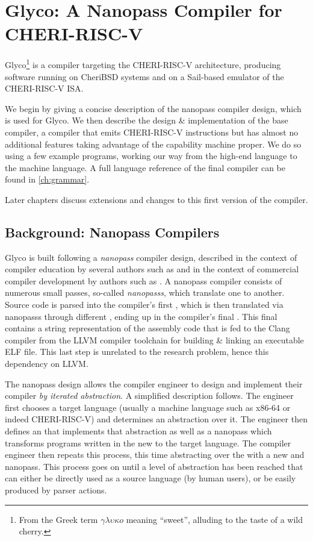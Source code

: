 \documentclass[main.tex]{subfiles}
\begin{document}
\onlyinsubfile{\mainmatter{}}

\chapter{Glyco: A Nanopass Compiler for CHERI-RISC-V}
Glyco\footnote{From the Greek term $\gamma\lambda\upsilon\kappa{}o$ meaning \enquote{sweet}, alluding to the taste of a wild cherry.} is a compiler targeting the CHERI-RISC-V architecture, producing software running on CheriBSD systems and on a Sail-based emulator of the CHERI-RISC-V ISA.

We begin by giving a concise description of the nanopass compiler design, which is used for Glyco. We then describe the design \& implementation of the base compiler, a compiler that emits CHERI-RISC-V instructions but has almost no additional features taking advantage of the capability machine proper. We do so using a few example programs, working our way from the high-end language to the machine language. A full language reference of the final compiler can be found in \cref{ch:grammar}.

Later chapters discuss extensions and changes to this first version of the compiler.

\section{Background: Nanopass Compilers}
Glyco is built following a \emph{nanopass} compiler design, described in the context of compiler education by several authors such as \cite{educomp} and in the context of commercial compiler development by authors such as \cite{commcomp}. A nanopass compiler consists of numerous small passes, so-called \emph{\glspl{nanopass}}, which translate one \emph{\il{}} to another. Source code is parsed into the compiler’s first \il{}, which is then translated via \glspl{nanopass} through different \ils{}, ending up in the compiler's final \il{}. This final \il{} contains a string representation of the assembly code that is fed to the Clang compiler from the LLVM compiler toolchain for building \& linking an executable ELF file. This last step is unrelated to the research problem, hence this dependency on LLVM.

The nanopass design allows the compiler engineer to design and implement their compiler \emph{by iterated abstraction}. A simplified description follows. The engineer first chooses a target language (usually a machine language such as x86-64 or indeed CHERI-RISC-V) and determines an abstraction over it. The engineer then defines an \il{} that implements that abstraction as well as a \gls{nanopass} which transforms programs written in the new \il{} to the target language. The compiler engineer then repeats this process, this time abstracting over the \il{} with a new \il{} and \gls{nanopass}. This process goes on until a level of abstraction has been reached that can either be directly used as a source language (by human users), or be easily produced by parser actions.
\end{document}
